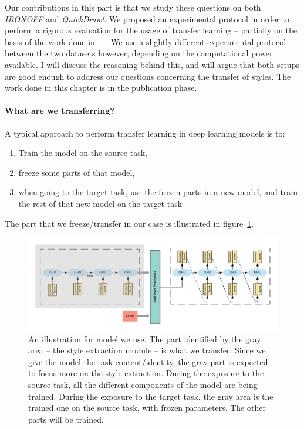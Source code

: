   \par Our contributions in this part is that we study these questions on both \textit{IRONOFF} and \textit{QuickDraw!}. We proposed an experimental protocol in order to perform a rigorous evaluation for the usage of transfer learning -- partially on the basis of the work done in~\citep{8686063} --. We use a slightly different experimental protocol between the two datasets however, depending on the computational power available. I will discuss the reasoning behind this, and will argue that both setups are good enough to address our questions concerning the transfer of styles. The work done in this chapter is in the publication phase.


  \paragraph{What are we transferring?} A typical approach to perform transfer learning in deep learning models is to:
    \begin{enumerate}
      \item Train the model on the source task,
      \item freeze some parts of that model,
      \item when going to the target task, use the frozen parts in a new model, and train the rest of that new model on the target task
    \end{enumerate}

    The part that we freeze/transfer in our case is illustrated in figure~\ref{fig:transfer_part_illustration}.
  \begin{figure}
    \includegraphics[scale=0.95]{./images/sota/transfer_part.jpeg}
    \caption{An illustration for model we use. The part identified by the gray area -- the style extraction module -- is what we transfer. Since we give the model the task content/identity, the gray part is expected to focus more on the style extraction. During the exposure to the source task, all the different components of the model are being trained. During the exposure to the target task, the gray area is the trained one on the source task, with frozen parameters. The other parts will be trained.}
    \label{fig:transfer_part_illustration}
  \end{figure}

